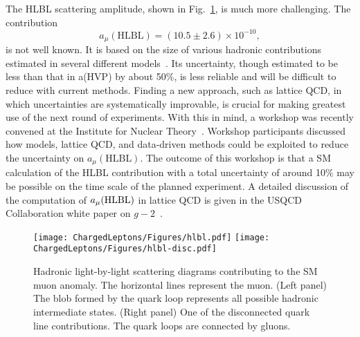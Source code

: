 The HLBL scattering amplitude, shown in
Fig.~\ref{fig:hlbl}, is much more challenging.  The contribution
\begin{equation}
    a_\mu(\textrm{HLBL}) = (10.5\pm 2.6) \times 10^{-10},
    \label{eq:PRV}
\end{equation}
is not well known. It is based on the size of various hadronic contributions estimated in
several different models~\cite{arXiv:0901.0306}.
Its uncertainty, though estimated to be less than that in a(HVP) by about 50\%, is less reliable and will be difficult to reduce with current methods.
Finding a new approach, such as lattice QCD, in which uncertainties are systematically improvable,
is crucial for making greatest use of the next round of experiments.
With this in mind, a workshop was recently convened at the Institute for Nuclear Theory~\cite{INTws}.
Workshop participants discussed how models, lattice QCD, and data-driven methods could be exploited to reduce the
uncertainty on $a_\mu(\textrm{HLBL})$.
The outcome of this workshop is that 
a SM calculation of the HLBL contribution with a total uncertainty of around 10\% may be possible on the time scale of the planned experiment.
A detailed discussion of the computation of $a_\mu(\rm HLBL)$ in lattice QCD is given in the USQCD Collaboration white paper on $g-2$~\cite{USQCD}.
%
\begin{figure}[bp]
    \centering
\vspace*{-2pt}
    \texttt{[image: ChargedLeptons/Figures/hlbl.pdf]}\hskip 1cm
    \texttt{[image: ChargedLeptons/Figures/hlbl-disc.pdf]}
    \caption{Hadronic light-by-light scattering diagrams contributing to the SM muon anomaly. The horizontal lines represent the muon. (Left panel) The blob formed by the quark loop represents all possible hadronic intermediate states.  (Right panel) One of the disconnected quark line contributions. The quark loops are connected by gluons.}
    \label{fig:hlbl}
\end{figure}
%


